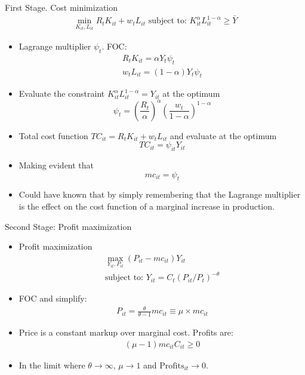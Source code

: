 \documentclass[11pt,aspectratio=169,xcolor={dvipsnames},hyperref={pdftex,pdfpagemode=UseNone,hidelinks,pdfdisplaydoctitle=true},usepdftitle=false]{beamer}
\begin{document}
\begin{frame}{First Stage. Cost minimization}
\begin{align}
\min_{K_{it},L_{it}} R_t K_{it} + w_t L_{it} \text{    subject to:  }  K_{it}^{\alpha}L_{it}^{1-\alpha} \geq \bar{Y}  
\end{align}
\begin{itemize}
\item Lagrange multiplier $\psi_t$. FOC:
\begin{align*}
R_t K_{it} = \alpha Y_t \psi_t \\ w_t L_{it} = (1-\alpha) Y_t \psi_t
\end{align*}
\item Evaluate the constraint  $K_{it}^{\alpha}L_{it}^{1-\alpha} = Y_{it} $ at the optimum
$$\psi_t = \left(\frac{R_t}{\alpha}\right)^{\alpha} \left(\frac{w_t}{1-\alpha}\right)^{1-\alpha}$$
\item Total cost function $TC_{it} = R_t K_{it} + w_t L_{it}$ and evaluate at the optimum
$$TC_{it} = \psi_{it} Y_{it}$$
\item Making evident that
$$mc_{it} = \psi_t$$
\item Could have known that by simply remembering that the Lagrange multiplier is the effect on the cost function of a marginal increase in production. 
\end{itemize}
\end{frame}

\begin{frame}{Second Stage: Profit maximization}
\begin{itemize}
\item Profit maximization
\begin{align*}
\max_{Y_{it},P_{it}} (P_{it} - mc_{it})Y_{it} \\ \text{subject to:   } Y_{it} = C_t (P_{it}/P_t)^{-\theta}
\end{align*}
\item FOC and simplify:
\begin{align*}
P_{it} = \frac{\theta}{\theta-1} mc_{it} \equiv \mu \times mc_{it}
\end{align*}
\item Price is a constant markup over marginal cost. Profits are:
\begin{align*}
(\mu - 1)mc_{it} C_{it} \geq 0
\end{align*}
\item In the limit where $\theta \rightarrow \infty$, $\mu \rightarrow 1$ and $\text{Profits}_{it} \rightarrow 0$.
\end{itemize}
\end{frame}
\end{document}
